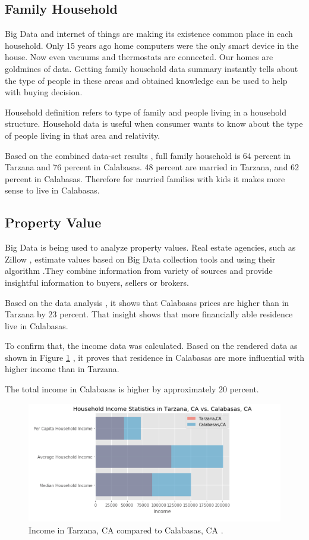 \documentclass[sigconf]{acmart}
\begin{document}
\subsection{Family Household}

Big Data and internet of things are making its existence common place in each household. Only 15 years ago home computers were the only smart device in the house.  Now even vacuums and thermostats are connected. Our homes are goldmines of data.  Getting family household data summary instantly tells about the type of people in these areas and obtained knowledge can be used to help with buying decision.

Household definition refers to type of family and people living in a household structure.
Household data is useful when consumer wants to know about the type of people living in that area and relativity.

Based on the combined data-set results \cite{md}, full family household is 64 percent in Tarzana and 76 percent in Calabasas. 48 percent are married in Tarzana, and 62 percent in Calabasas. Therefore for married families with kids it makes more sense to live in Calabasas.

\subsection{Property Value}

Big Data is being used to analyze property values. Real estate agencies, such as Zillow \cite{zillow}, estimate values based on Big Data collection tools and using their algorithm  \cite{zestimate}.They combine information from variety of sources and provide insightful information to buyers, sellers or brokers. 

Based on the data analysis \cite{md}, it shows that Calabasas prices are higher than in Tarzana by 23 percent. That insight shows that more financially able residence live in Calabasas.

To confirm that, the income data was calculated. Based on the rendered data as shown in Figure \ref{fig:figure7} \cite{md}, it proves that residence in Calabasas are more influential with higher income than in Tarzana.

The total income in Calabasas is higher by approximately 20 percent.

\begin{figure}
  \centering
  \includegraphics[width=1.0\columnwidth]{images/figure7.png}
  \caption{Income in Tarzana, CA compared to Calabasas, CA  \cite{md}.} \label{fig:figure7} 
\end{figure}
\end{document}
